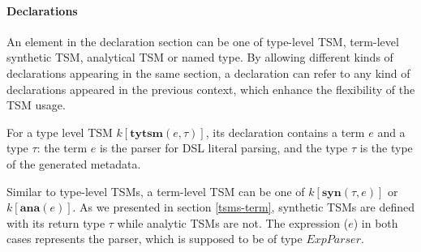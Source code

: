 \documentclass{sig-alternate}
\makeatletter
\newcommand\BeraMonottfamily{%
  \def\fvm@Scale{0.85}%
  \fontfamily{fvm}\selectfont%
}
\newcommand{\textcd}[1]{\textbf{\scriptsize\BeraMonottfamily{#1}}}
\newcommand{\mycaption}[1]{\vspace{-4px}\caption{#1}\vspace{-2px}}
\newcommand{\tabularspace}{~~~~~~}
\makeatother
\begin{document}
\begin{comment}
$\omega$~::=~$\emptyset$                      \\
\tabularspace$l[\mathbf{val},\tau];\omega$                 & \textcd{val} $l$ : $\tau$\\
\tabularspace$l[\mathbf{def},\tau];\omega$                 & \textcd{def} $l$ : $\tau$\\
\multicolumn{3}{l}{Casetype Cases}\\
$\chi$~::=~$\emptyset$                      \\                 
\tabularspace$C[\tau];\chi$                   & $C$~\textcd{of}~$\tau$\\
\multicolumn{3}{l}{External Term}\\
 $e$~::=~...                              & \\
\tabularspace$\mathbf{lit}[body]$             & $delims$\\
\tabularspace$\mathbf{ekey}[k,body](e)$       & $e.k$ $delims$\\
\multicolumn{3}{l}{Translational Terms}\\
$\hat{e}$~::=~...                              & \\
\tabularspace$\mathbf{spliced}[e]$            & \\
\multicolumn{3}{l}{Internal Terms}\\
$i$~::=~...                                                     
\end{tabular}
\mycaption{Abstract and Concrete Forms}
\label{formal-syntax}
\end{figure}
\end{comment}


\paragraph{Declarations}
An element in the declaration section can be one of type-level TSM, term-level synthetic TSM, analytical TSM or named type. By allowing different kinds of declarations appearing in the same section, a declaration can refer to any kind of declarations appeared in the previous context, which enhance the flexibility of the TSM usage.

For a type level TSM $k[\mathbf{tytsm}(e,\tau)]$, its declaration contains a term $e$ and a type $\tau$: the term $e$ is the parser for DSL literal parsing, and the type $\tau$ is the type of the generated metadata.

Similar to type-level TSMs, a term-level TSM can be one of $k[\mathbf{syn}(\tau,e)]$ or $k[\mathbf{ana}(e)]$. As we presented in section \ref{tsms-term}, synthetic TSMs are defined with its return type $\tau$ while analytic TSMs are not. The expression ($e$) in both cases represents the parser, which is supposed to be of type $ExpParser$.
\end{document}
